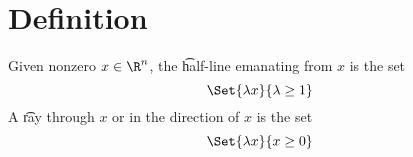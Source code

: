 
\section*{Definition}

Given nonzero $x \in \R ^n$, the \t{half-line} emanating from $x$ is the set
\[
\Set{\lambda x}{\lambda  \geq 1}
\]
A \t{ray} through $x$ or in the direction of $x$ is the set
\[
\Set{\lambda x}{x \geq 0}
\]

\blankpage